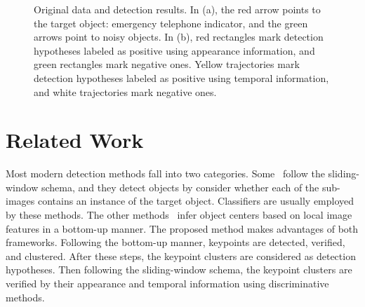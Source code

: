\begin{figure}
\centering
{}
\caption[Target objects and detection results]{Original data and detection results. In (a), the red arrow points to the target object: emergency telephone indicator, and the green arrows point to noisy objects. In (b), red rectangles mark detection hypotheses labeled as positive using appearance information, and green rectangles mark negative ones. Yellow trajectories mark detection hypotheses labeled as positive using temporal information, and white trajectories mark negative ones.}
\label{fig:first}
\end{figure}









\section{Related Work}
\label{rw}

Most modern detection methods fall into two categories. Some~\cite{ij4,ac31,ac30,ac4,ac32,ac29,ac28,ac1} follow the sliding-window schema, and they detect objects by consider whether each of the sub-images contains an instance of the target object. Classifiers are usually employed by these methods. The other methods~\cite{ac9,ac2,ac3,ac22,lb1,ac5,ac10,ac21,ac18} infer object centers based on local image features in a bottom-up manner. The proposed method makes advantages of both frameworks. Following the bottom-up manner, keypoints are detected, verified, and clustered. After these steps, the keypoint clusters are considered as detection hypotheses. Then following the sliding-window schema, the keypoint clusters are verified by their appearance and temporal information using discriminative methods.

